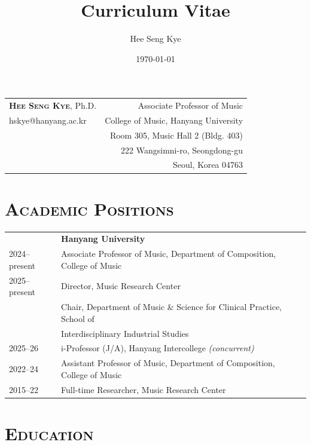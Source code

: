\documentclass[a4paper,11pt,draft]{article}
\title{Curriculum Vitae}
\author{Hee Seng Kye}
\date{\today}
\begin{document}
  \renewcommand{\headrulewidth}{0pt}
  \fancyhf{}
  \fancyfoot[RE,RO]{\small \thepage}
  
  \raggedright \parindent=15pt
  
  \hspace*{-0.8cm}
  \begin{tabular}{p{9.69cm} r}
    {\Large \textsc{\textbf{Hee Seng Kye}}}, Ph.D. & Associate Professor of Music\\
    hskye@hanyang.ac.kr & College of Music, Hanyang University\\
    & Room 305, Music Hall 2 (Bldg. 403)\\
    & 222 Wangsimni-ro, Seongdong-gu\\
    & Seoul, Korea 04763
  \end{tabular}
  
  \vspace{3mm}
  
  \section*{\textsc{Academic Positions}}
  
  \hspace*{-0.25cm}
  \begin{tabular}{p{2.5cm} p{12.5cm}}
    & \textbf{Hanyang University}\\
      2024--present & Associate Professor of Music, Department of Composition, College of Music\\[1mm]
      2025--present & Director, Music Research Center\\
      & Chair, Department of Music \& Science for Clinical Practice, School of \\
      & Interdisciplinary Industrial Studies\\[1mm]
  	2025--26 & i-Professor (J/A), Hanyang Intercollege \textit{(concurrent)}\\[1mm]
    2022--24 & Assistant Professor of Music, Department of Composition, College of Music\\[1mm]
    2015--22 & Full-time Researcher, Music Research Center
  \end{tabular}
  
  \vspace{3mm}
  
  \section*{\textsc{Education}}
  
\end{document}
